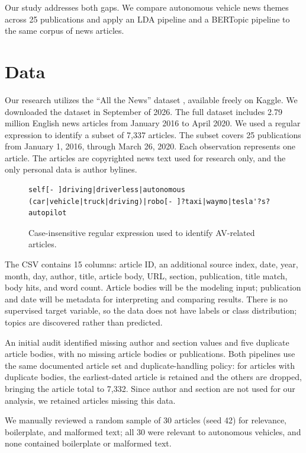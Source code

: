 \documentclass[conference]{IEEEtran}
\begin{document}
Our study addresses both gaps. We compare autonomous vehicle news themes across 25 publications and apply an LDA pipeline and a BERTopic pipeline to the same corpus of news articles.


\section*{Data}
Our research utilizes the ``All the News'' dataset \cite{mckinley2021}, available freely on Kaggle. We downloaded the dataset in September of 2026. The full dataset includes 2.79 million English news articles from January 2016 to April 2020. We used a regular expression to identify a subset of 7,337 articles. The subset covers 25 publications from January 1, 2016, through March 26, 2020. Each observation represents one article. The articles are copyrighted news text used for research only, and the only personal data is author bylines.

\begin{figure}[H]
\centering
\begin{lstlisting}
self[- ]driving|driverless|autonomous (car|vehicle|truck|driving)|robo[- ]?taxi|waymo|tesla'?s? autopilot
\end{lstlisting}
\caption{Case-insensitive regular expression used to identify AV-related articles.}
\label{fig:regex}
\end{figure}

The CSV contains 15 columns: article ID, an additional source index, date, year, month, day, author, title, article body, URL, section, publication, title match, body hits, and word count. Article bodies will be the modeling input; publication and date will be metadata for interpreting and comparing results. There is no supervised target variable, so the data does not have labels or class distribution; topics are discovered rather than predicted.

An initial audit identified missing author and section values and five duplicate article bodies, with no missing article bodies or publications. Both pipelines use the same documented article set and duplicate-handling policy: for articles with duplicate bodies, the earliest-dated article is retained and the others are dropped, bringing the article total to 7,332. Since author and section are not used for our analysis, we retained articles missing this data.

We manually reviewed a random sample of 30 articles (seed 42) for relevance, boilerplate, and malformed text; all 30 were relevant to autonomous vehicles, and none contained boilerplate or malformed text.
\end{document}
